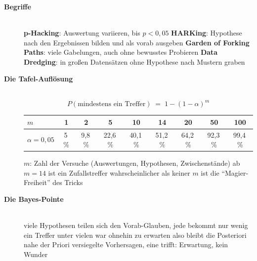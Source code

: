 \begin{description}
\item[{\rot\bf Begriffe}]~\\[-\lblskip]
\bi
  \ite \textbf{p-Hacking}: Auswertung variieren, bis $p<0{,}05$
    \parencite{simmons2011falsepositive}
  \ite \textbf{HARKing}: Hypothese nach den Ergebnissen bilden und als
    vorab ausgeben \parencite{kerr1998harking}
  \ite \textbf{Garden of Forking Paths}: viele Gabelungen, auch ohne
    bewusstes Probieren \parencite{gelmanloken2014forking}
  \ite \textbf{Data Dredging}: in großen Datensätzen ohne Hypothese nach
    Mustern graben
\ei
\os{\newpage}

\item[{\rot\bf Die Tafel-Auflösung}]~\\[-\lblskip]
\[
P(\text{mindestens ein Treffer}) \;=\; 1-(1-\alpha)^m
\]
\begin{center}
\small
\begin{tabular}{@{}lcccccccc@{}}
\toprule
$m$ & 1 & 2 & 5 & 10 & 14 & 20 & 50 & 100 \\
\midrule
$\alpha=0{,}05$ & 5\,\% & 9,8\,\% & 22,6\,\% & 40,1\,\% & 51,2\,\% & 64,2\,\% & 92,3\,\% & 99,4\,\% \\
\bottomrule
\end{tabular}
\end{center}
\bi
  \ite $m$: Zahl der Versuche (Auswertungen, Hypothesen,
    Zwischenstände)
  \ite ab $m=14$ ist ein Zufallstreffer wahrscheinlicher als keiner
  \ite $m$ ist die \enquote{Magier-Freiheit} des Tricks
\ei
{}
\os{\newpage}

\item[{\rot\bf Die Bayes-Pointe}]~\\[-\lblskip]
\bi
  \ite viele Hypothesen teilen sich den Vorab-Glauben, jede bekommt nur
    wenig
  \ite ein Treffer unter vielen war ohnehin zu erwarten
  \ite also bleibt die Posteriori nahe der Priori
   versiegelte Vorhersagen, eine trifft: Erwartung, kein Wunder
\ei
{}
\os{\newpage}


\end{description}
